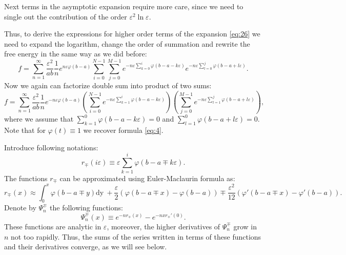 \documentclass{article}
\newcommand{\dy}{\mathrm{dy}~}
\begin{document}
Next terms in the asymptotic expansion require more care, since we need to single out the
contribution of the order $\varepsilon^{2}\ln\varepsilon$.

Thus, to derive the expressions for higher order terms of the expansion \eqref{eq:26} we need to
expand the logarithm, change the order of summation and rewrite the free energy in the same way as
we did before:
\begin{equation}
  \label{eq:22}
   f=\sum_{n=1}^{\infty}\frac{\varepsilon^{2}}{ab}\frac{1}{n}e^{n\varepsilon
     \varphi(b-a)}\sum_{i=0}^{N-1}\sum_{j=0}^{M-1} e^{-n\varepsilon\sum_{k=0}^{i}\varphi\left(b-a-k\varepsilon\right)}
    e^{-n\varepsilon\sum_{l=0}^{j}\varphi\left(b-a+l\varepsilon\right)}.
\end{equation}
Now we again can factorize double sum into product of two sums:
\begin{equation}
  \label{eq:23}
    f=\sum_{n=1}^{\infty}\frac{\varepsilon^{2}}{ab}\frac{1}{n}e^{-n\varepsilon
     \varphi(b-a)}\left(\sum_{i=0}^{N-1}
     e^{-n\varepsilon\sum_{k=1}^{i}\varphi\left(b-a-k\varepsilon\right)}\right)
   \left(\sum_{j=0}^{M-1}e^{-n\varepsilon\sum_{l=1}^{j}\varphi\left(b-a+l\varepsilon\right)}\right),
 \end{equation}
where we assume that $\sum_{k=1}^{0}\varphi(b-a-k\varepsilon)=0$ and
$\sum_{l=1}^{0}\varphi(b-a+l\varepsilon)=0$. Note that for $\varphi(t)\equiv 1$ we recover formula
\eqref{eq:4}.



Introduce following notations:
\begin{equation}
  \label{eq:52}
  r_{\mp}(i\varepsilon)\equiv\varepsilon\sum_{k=1}^{i}\varphi(b-a\mp k\varepsilon).
\end{equation}
The functions $r_{\mp}$ can be approximated using Euler-Maclaurin formula as:
\begin{equation}
  \label{eq:53}
  r_{\mp}(x)\approx\int_{0}^{x}\varphi(b-a\mp y) \dy +\frac{\varepsilon}{2}\left(\varphi(b-a\mp
    x)-\varphi(b-a)\right)\mp \frac{\varepsilon^{2}}{12}\left(\varphi'(b-a\mp x)-\varphi'(b-a)\right).
\end{equation}
Denote by $\Psi_{n}^{\mp}$ the following functions:
\begin{equation}
  \label{eq:54}
  \Psi^{\mp}_{n}(x)\equiv e^{-nr_{\mp}(x)}-e^{-nxr_{\mp}'(0)}.
\end{equation}
These functions are analytic in $\varepsilon$, moreover, the higher derivatives of $\Psi^{\mp}_{n}$
grow in $n$ not too rapidly. Thus, the sums of the series written in terms of these functions and
their derivatives converge, as we will see below.
\end{document}
